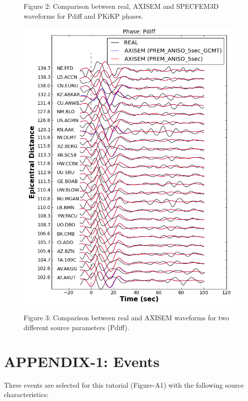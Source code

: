 \documentclass{article}
\begin{document}
\begin{figure}[H]
\begin{minipage}{.5\textwidth}
{\small{}Figure 2: Comparison between real, AXISEM and SPECFEM3D waveforms for 
Pdiff and PKiKP phases.}
\end{minipage}%
\begin{minipage}{.5\textwidth}
  \centering
  \includegraphics[width=0.9\linewidth]{AXISEMTutorial-fig014.png}

{\small{}Figure 3: Comparison between real and AXISEM waveforms for two different 
source parameters (Pdiff).}
\end{minipage}
\begin{center}
\end{center}
\end{figure}


\newpage
\appendix
\section{APPENDIX-1: Events}

Three events are selected for this tutorial (Figure-A1) with the following source 
characteristics:
\end{document}
